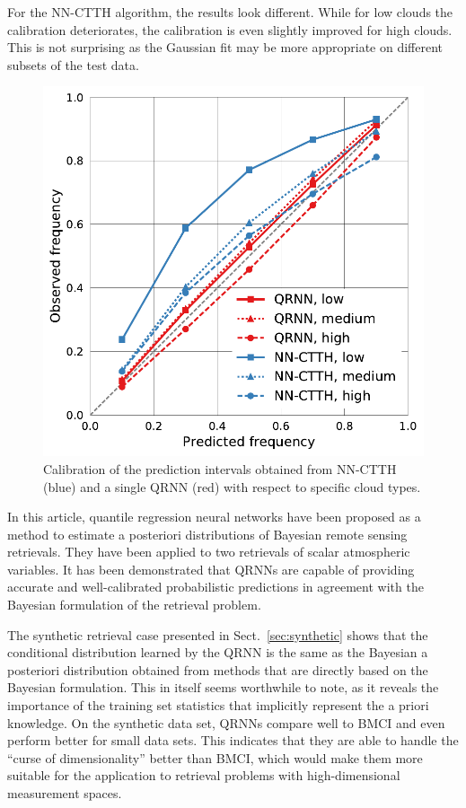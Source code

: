 \documentclass[journal abbreviation, manuscript]{copernicus}
\begin{document}
 For the NN-CTTH algorithm, the results look different. While for low clouds
the calibration deteriorates, the calibration is even slightly improved for
high clouds. This is not surprising as the Gaussian fit may be more
appropriate on different subsets of the test data. 

  \begin{figure}[hbpt!]
    \centering
    \includegraphics[width = 0.5\linewidth]{../plots/fig11}
    \caption{Calibration of the prediction intervals obtained from NN-CTTH (blue) and
      a single QRNN (red) with respect to specific cloud types.}
    \label{fig:calibration_cloud_type}
  \end{figure}


\conclusions  %
\label{sec:conclusions}

In this article, quantile regression neural networks have been proposed as a
method to estimate a posteriori distributions of Bayesian remote sensing retrievals.
They have been applied to two retrievals of scalar atmospheric variables. It has
been demonstrated that QRNNs are capable of providing accurate and
well-calibrated probabilistic predictions in agreement with the Bayesian
formulation of the retrieval problem.

The synthetic retrieval case presented in Sect.~\ref{sec:synthetic} shows that
the conditional distribution learned by the QRNN is the same as the Bayesian a
posteriori distribution obtained from methods that are directly based on the
Bayesian formulation. This in itself seems worthwhile to note, as it reveals the
importance of the training set statistics that implicitly represent the a priori
knowledge. On the synthetic data set, QRNNs compare well to BMCI and even perform
better for small data sets. This indicates that they are able to handle the
``curse of dimensionality'' \citep{friedman} better than BMCI, which would make them more suitable
for the application to retrieval problems with high-dimensional measurement
spaces.
\end{document}
